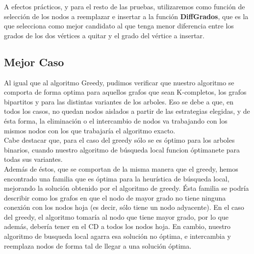 A efectos prácticos, y para el resto de las pruebas, utilizaremos como función de selección de los nodos a reemplazar e insertar a la función \textbf{DiffGrados}, que es la que selecciona como mejor candidato al que tenga menor diferencia entre los grados de los dos vértices a quitar y el grado del vértice a insertar.

\subsection{Mejor Caso}
Al igual que al algoritmo Greedy, pudimos verificar que nuestro algoritmo se comporta de forma optima para aquellos grafos que sean K-completos, los grafos bipartitos y para las distintas variantes de los arboles. Eso se debe a que, en todos los casos, no quedan nodos aislados a partir de las estrategias elegidas, y de ésta forma, la eliminación o el intercambio de nodos va trabajando con los mismos nodos con los que trabajaría el algoritmo exacto. \\
Cabe destacar que, para el caso del greedy sólo se es óptimo para los arboles binarios, cuando nuestro algoritmo de búsqueda local funcion óptimanete para todas sus variantes.\\
Además de éstos, que se comportan de la misma manera que el greedy, hemos encontrado una familia que es óptima para la heurística de búsqueda local, mejorando la solución obtenido por el algoritmo de greedy. Ésta familia se podría describir como los grafos en que el nodo de mayor grado no tiene ninguna conexión con los nodos hoja (es decir, sólo tiene un nodo adyacente). En el caso del greedy, el algoritmo tomaría al nodo que tiene mayor grado, por lo que además, debería tener en el CD a todos los nodos hoja. En cambio, nuestro algoritmo de busqueda local agarra esa solución no óptima, e intercambia y reemplaza nodos de forma tal de llegar a una solución óptima. \\

